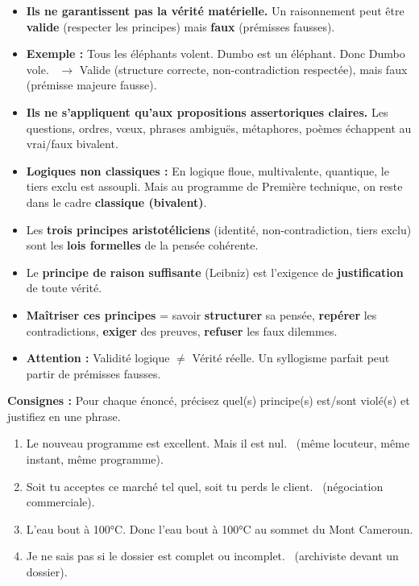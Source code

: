 \documentclass[11pt]{article}
\begin{document}
\begin{propriete}
\begin{itemize}
    \item \textbf{Ils ne garantissent pas la vérité matérielle.} Un raisonnement peut être \textbf{valide} (respecter les principes) mais \textbf{faux} (prémisses fausses).
    \item \textbf{Exemple :} \og Tous les éléphants volent. Dumbo est un éléphant. Donc Dumbo vole. \fg\ $\rightarrow$ Valide (structure correcte, non-contradiction respectée), mais faux (prémisse majeure fausse).
    \item \textbf{Ils ne s'appliquent qu'aux propositions assertoriques claires.} Les questions, ordres, vœux, phrases ambiguës, métaphores, poèmes échappent au vrai/faux bivalent.
    \item \textbf{Logiques non classiques :} En logique floue, multivalente, quantique, le tiers exclu est assoupli. Mais au programme de Première technique, on reste dans le cadre \textbf{classique (bivalent)}.
\end{itemize}
\end{propriete}

\begin{aretenir}
\begin{itemize}
    \item Les \textbf{trois principes aristotéliciens} (identité, non-contradiction, tiers exclu) sont les \textbf{lois formelles} de la pensée cohérente.
    \item Le \textbf{principe de raison suffisante} (Leibniz) est l'exigence de \textbf{justification} de toute vérité.
    \item \textbf{Maîtriser ces principes} = savoir \textbf{structurer} sa pensée, \textbf{repérer} les contradictions, \textbf{exiger} des preuves, \textbf{refuser} les faux dilemmes.
    \item \textbf{Attention :} Validité logique $\neq$ Vérité réelle. Un syllogisme parfait peut partir de prémisses fausses.
\end{itemize}
\end{aretenir}

\begin{exercice}
\textbf{Consignes :} Pour chaque énoncé, précisez quel(s) principe(s) est/sont violé(s) et justifiez en une phrase.
\begin{enumerate}
    \item \og Le nouveau programme est excellent. Mais il est nul. \fg\ (même locuteur, même instant, même programme).
    \item \og Soit tu acceptes ce marché tel quel, soit tu perds le client. \fg\ (négociation commerciale).
    \item \og L'eau bout à 100°C. Donc l'eau bout à 100°C au sommet du Mont Cameroun. \fg
    \item \og Je ne sais pas si le dossier est complet ou incomplet. \fg\ (archiviste devant un dossier).
\end{enumerate}
\end{exercice}
\end{document}

